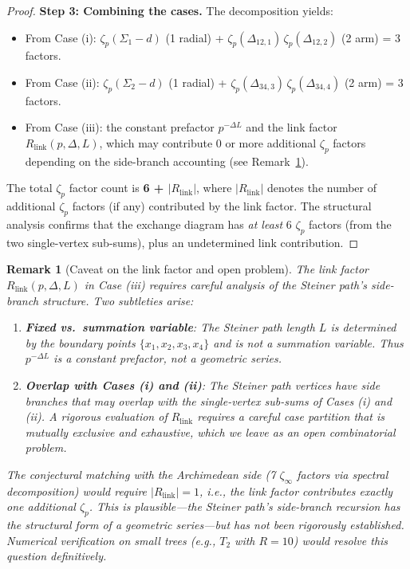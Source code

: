 \documentclass[11pt,a4paper]{article}
\newtheorem{remark}{Remark}
\begin{document}
\begin{proof}
\textbf{Step 3: Combining the cases.} The decomposition yields:
\begin{itemize}[leftmargin=2em]
    \item From Case (i): $\zeta_p(\Sigma_1 - d)$ (1 radial) + $\zeta_p(\Delta_{12,1})\,\zeta_p(\Delta_{12,2})$ (2 arm) = 3 factors.
    \item From Case (ii): $\zeta_p(\Sigma_2 - d)$ (1 radial) + $\zeta_p(\Delta_{34,3})\,\zeta_p(\Delta_{34,4})$ (2 arm) = 3 factors.
    \item From Case (iii): the constant prefactor $p^{-\Delta L}$ and the link factor $R_{\mathrm{link}}(p, \Delta, L)$, which may contribute 0 or more additional $\zeta_p$ factors depending on the side-branch accounting (see Remark~\ref{rem:link-caveat}).
\end{itemize}
The total $\zeta_p$ factor count is \textbf{6 + $|R_{\mathrm{link}}|$}, where $|R_{\mathrm{link}}|$ denotes the number of additional $\zeta_p$ factors (if any) contributed by the link factor. The structural analysis confirms that the exchange diagram has \emph{at least} 6 $\zeta_p$ factors (from the two single-vertex sub-sums), plus an undetermined link contribution. \qedhere
\end{proof}

\begin{remark}[Caveat on the link factor and open problem]
\label{rem:link-caveat}
The link factor $R_{\mathrm{link}}(p, \Delta, L)$ in Case (iii) requires careful analysis of the Steiner path's side-branch structure. Two subtleties arise:
\begin{enumerate}[leftmargin=2em]
    \item \textbf{Fixed vs.\ summation variable}: The Steiner path length $L$ is determined by the boundary points $\{x_1, x_2, x_3, x_4\}$ and is not a summation variable. Thus $p^{-\Delta L}$ is a constant prefactor, not a geometric series.
    \item \textbf{Overlap with Cases (i) and (ii)}: The Steiner path vertices have side branches that may overlap with the single-vertex sub-sums of Cases (i) and (ii). A rigorous evaluation of $R_{\mathrm{link}}$ requires a careful case partition that is mutually exclusive and exhaustive, which we leave as an open combinatorial problem.
\end{enumerate}
The conjectural matching with the Archimedean side (7 $\zeta_\infty$ factors via spectral decomposition) would require $|R_{\mathrm{link}}| = 1$, i.e., the link factor contributes exactly one additional $\zeta_p$. This is plausible---the Steiner path's side-branch recursion has the structural form of a geometric series---but has \emph{not} been rigorously established. Numerical verification on small trees (e.g., $T_2$ with $R = 10$) would resolve this question definitively.
\end{remark}
\end{document}
